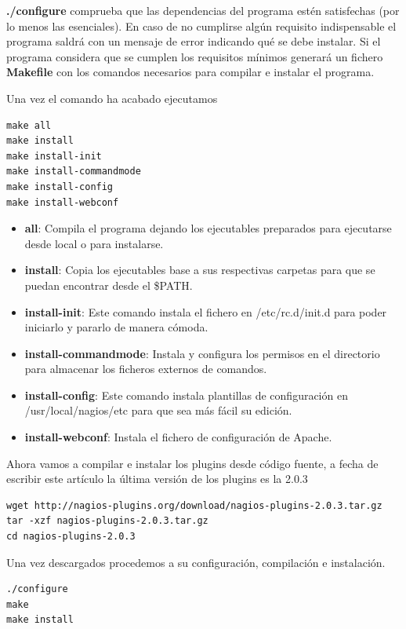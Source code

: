 \documentclass[11pt,a4paper]{article}
\begin{document}
\textbf{./configure} comprueba que las dependencias del programa estén satisfechas (por lo menos las esenciales). En caso de no cumplirse algún requisito indispensable el programa saldrá con un mensaje de error indicando qué se debe instalar. Si el programa considera que se cumplen los requisitos mínimos generará un fichero \textbf{Makefile} con los comandos necesarios para compilar e instalar el programa.

Una vez el comando ha acabado ejecutamos

\begin{verbatim}
make all
make install
make install-init
make install-commandmode
make install-config
make install-webconf
\end{verbatim}

\begin{itemize}
\item \textbf{all}: Compila el programa dejando los ejecutables preparados para ejecutarse desde local o para instalarse.
\item \textbf{install}: Copia los ejecutables base a sus respectivas carpetas para que se puedan encontrar desde el \$PATH.
\item \textbf{install-init}: Este comando instala el fichero en /etc/rc.d/init.d para poder iniciarlo y pararlo de manera cómoda.
\item \textbf{install-commandmode}: Instala y configura los permisos en el directorio para almacenar los ficheros externos de comandos.
\item \textbf{install-config}: Este comando instala plantillas de configuración en /usr/local/nagios/etc para que sea más fácil su edición.
\item \textbf{install-webconf}: Instala el fichero de configuración de Apache.
\end{itemize}

Ahora vamos a compilar e instalar los plugins desde código fuente, a fecha de escribir este artículo la última versión de los plugins es la 2.0.3

\begin{verbatim}
wget http://nagios-plugins.org/download/nagios-plugins-2.0.3.tar.gz
tar -xzf nagios-plugins-2.0.3.tar.gz
cd nagios-plugins-2.0.3
\end{verbatim}

Una vez descargados procedemos a su configuración, compilación e instalación.

\begin{verbatim}
./configure
make
make install
\end{verbatim}
\end{document}
